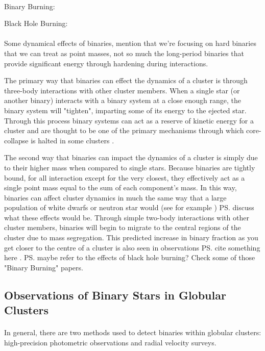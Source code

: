 \paragraph{}
Binary Burning: \citet{Chatterjee2013}


Black Hole Burning: \citet{Kremer2019}
\paragraph{}


Some dynamical effects of binaries, mention that we're focusing on hard binaries that we can treat
as point masses, not so much the long-period binaries that provide significant energy through
hardening during interactions.

The primary way that binaries can effect the dynamics of a cluster is through three-body
interactions with other cluster members. When a single star (or another binary) interacts with a
binary system at a close enough range, the binary system will "tighten", imparting some of its energy
to the ejected star. Through this process binary systems can act as a reserve of kinetic energy for
a cluster and are thought to be one of the primary mechanisms through which core-collapse is halted
in some clusters \citep{Chatterjee2013}.


The second way that binaries can impact the dynamics of a cluster is simply due to their higher mass
when compared to single stars. Because binaries are tightly bound, for all interaction except for
the very closest, they effectively act as a single point mass equal to the sum of each component's
mass. In this way, binaries can affect cluster dynamics in much the same way that a large population
of white dwarfs or neutron star would (see for example \citet{Kremer2021}) \ps{discuss what these
effects would be}. Through simple two-body interactions with other cluster members, binaries will
begin to migrate to the central regions of the cluster due to mass segregation. This predicted
increase in binary fraction as you get closer to the centre of a cluster is also seen in
observations \ps{cite something here }. \ps{maybe refer to the effects of black hole burning?
	\citet{Kremer2019}} Check some of those "Binary Burning" papers.

\subsection{Observations of Binary Stars in Globular Clusters}

\paragraph{}
In general, there are two methods used to detect binaries within globular clusters: high-precision
photometric observations and radial velocity surveys.

